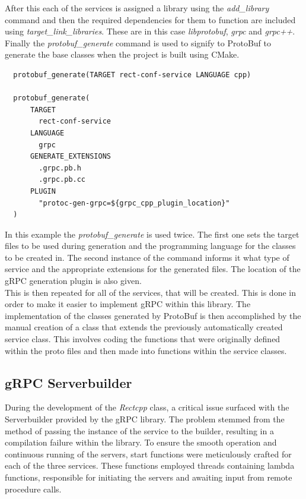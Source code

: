 After this each of the services is assigned a library using the \textit{add\_library} command and then the required dependencies for them to function are included using
\textit{target\_link\_libraries}. These are in this case \textit{libprotobuf}, \textit{grpc} and \textit{grpc++}.\\

Finally the \textit{protobuf\_generate} command is used to signify to ProtoBuf to generate the base classes when the project is built using CMake. 
\begin{lstlisting}
  protobuf_generate(TARGET rect-conf-service LANGUAGE cpp)

  protobuf_generate(
      TARGET
        rect-conf-service
      LANGUAGE
        grpc 
      GENERATE_EXTENSIONS
        .grpc.pb.h
        .grpc.pb.cc
      PLUGIN 
        "protoc-gen-grpc=${grpc_cpp_plugin_location}"
  )
\end{lstlisting}
In this example the \textit{protobuf\_generate} is used twice. The first one sets the target files to be used during generation and the programming language 
for the classes to be created in. The second instance of the command informs it what type of service and the appropriate extensions for the generated files. 
The location of the gRPC generation plugin is also given.\\

This is then repeated for all of the services, that will be created. This is done in order to make it easier to implement gRPC within this library. 
The implementation of the classes generated by ProtoBuf is then accomplished by the manual creation of a class that extends the previously automatically 
created service class. This involves coding the functions that were originally defined within the proto files and then made into functions within the service classes.

\subsection{gRPC Serverbuilder}
During the development of the \textit{Rectcpp} class, a critical issue surfaced with the Serverbuilder provided by the gRPC library. The problem stemmed from the method of 
passing the instance of the service to the builder, resulting in a compilation failure within the library. To ensure the smooth operation and continuous running of 
the servers, start functions were meticulously crafted for each of the three services. These functions employed threads containing lambda functions, responsible for 
initiating the servers and awaiting input from remote procedure calls. \\

